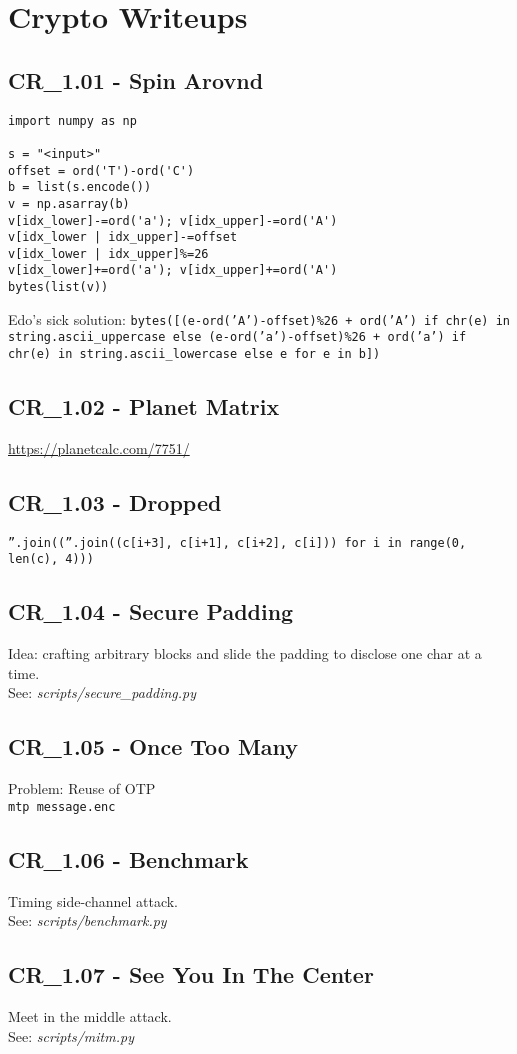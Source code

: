 \chapter{Crypto Writeups}

\section{CR_1.01 - Spin Arovnd}
\begin{verbatim}
import numpy as np

s = "<input>"
offset = ord('T')-ord('C')
b = list(s.encode())
v = np.asarray(b)
v[idx_lower]-=ord('a'); v[idx_upper]-=ord('A')
v[idx_lower | idx_upper]-=offset
v[idx_lower | idx_upper]%=26
v[idx_lower]+=ord('a'); v[idx_upper]+=ord('A')
bytes(list(v))
\end{verbatim} 

Edo's sick solution: \texttt{bytes([(e-ord('A')-offset)\%26 + ord('A') if chr(e) in string.ascii_uppercase else (e-ord('a')-offset)\%26 + ord('a') if chr(e) in string.ascii_lowercase else e for e in b])}

\section{CR_1.02 - Planet Matrix}
\url{https://planetcalc.com/7751/}

\section{CR_1.03 - Dropped}
\texttt{''.join((''.join((c[i+3], c[i+1], c[i+2], c[i])) for i in range(0, len(c), 4)))}

\section{CR_1.04 - Secure Padding}
Idea: crafting arbitrary blocks and slide the padding to disclose one char at a time. \\
See: \textit{scripts/secure_padding.py}

\section{CR_1.05 - Once Too Many}
Problem: Reuse of OTP \\
\texttt{mtp message.enc}

\section{CR_1.06 - Benchmark}
Timing side-channel attack. \\
See: \textit{scripts/benchmark.py}

\section{CR_1.07 - See You In The Center}
Meet in the middle attack. \\
See: \textit{scripts/mitm.py}